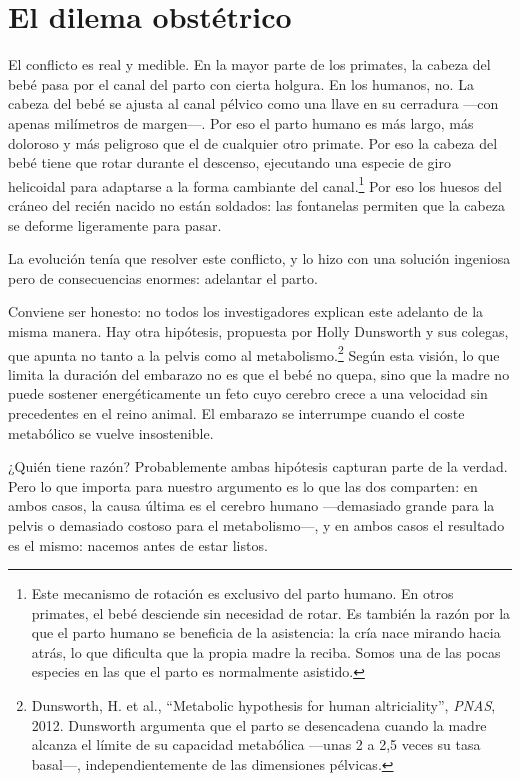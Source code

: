 \section{El dilema obstétrico}

El conflicto es real y medible. En la mayor parte de los primates, la cabeza del bebé pasa por el canal del parto con cierta holgura. En los humanos, no. La cabeza del bebé se ajusta al canal pélvico como una llave en su cerradura ---con apenas milímetros de margen---. Por eso el parto humano es más largo, más doloroso y más peligroso que el de cualquier otro primate. Por eso la cabeza del bebé tiene que rotar durante el descenso, ejecutando una especie de giro helicoidal para adaptarse a la forma cambiante del canal.\footnote{Este mecanismo de rotación es exclusivo del parto humano. En otros primates, el bebé desciende sin necesidad de rotar. Es también la razón por la que el parto humano se beneficia de la asistencia: la cría nace mirando hacia atrás, lo que dificulta que la propia madre la reciba. Somos una de las pocas especies en las que el parto es normalmente asistido.} Por eso los huesos del cráneo del recién nacido no están soldados: las fontanelas permiten que la cabeza se deforme ligeramente para pasar.

La evolución tenía que resolver este conflicto, y lo hizo con una solución ingeniosa pero de consecuencias enormes: adelantar el parto.

Conviene ser honesto: no todos los investigadores explican este adelanto de la misma manera. Hay otra hipótesis, propuesta por Holly Dunsworth y sus colegas, que apunta no tanto a la pelvis como al metabolismo.\footnote{Dunsworth, H. et al., ``Metabolic hypothesis for human altriciality'', \textit{PNAS}, 2012. Dunsworth argumenta que el parto se desencadena cuando la madre alcanza el límite de su capacidad metabólica ---unas 2 a 2,5 veces su tasa basal---, independientemente de las dimensiones pélvicas.} Según esta visión, lo que limita la duración del embarazo no es que el bebé no quepa, sino que la madre no puede sostener energéticamente un feto cuyo cerebro crece a una velocidad sin precedentes en el reino animal. El embarazo se interrumpe cuando el coste metabólico se vuelve insostenible.

¿Quién tiene razón? Probablemente ambas hipótesis capturan parte de la verdad. Pero lo que importa para nuestro argumento es lo que las dos comparten: en ambos casos, la causa última es el cerebro humano ---demasiado grande para la pelvis o demasiado costoso para el metabolismo---, y en ambos casos el resultado es el mismo: nacemos antes de estar listos.

